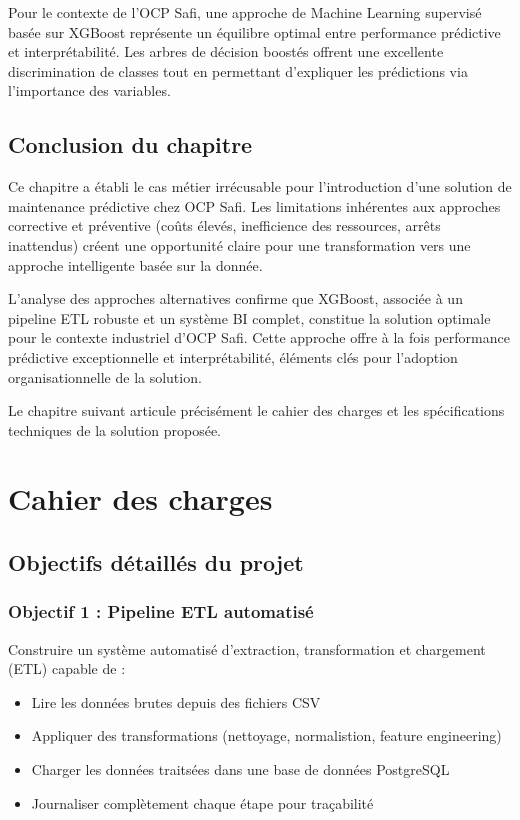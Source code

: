 \documentclass[a4paper,12pt,twoside]{report}
\begin{document}
Pour le contexte de l'OCP Safi, une approche de Machine Learning supervisé basée sur XGBoost représente un équilibre optimal entre performance prédictive et interprétabilité. Les arbres de décision boostés offrent une excellente discrimination de classes tout en permettant d'expliquer les prédictions via l'importance des variables.

\section*{Conclusion du chapitre}

Ce chapitre a établi le cas métier irrécusable pour l'introduction d'une solution de maintenance prédictive chez OCP Safi. Les limitations inhérentes aux approches corrective et préventive (coûts élevés, inefficience des ressources, arrêts inattendus) créent une opportunité claire pour une transformation vers une approche intelligente basée sur la donnée.

L'analyse des approches alternatives confirme que XGBoost, associée à un pipeline ETL robuste et un système BI complet, constitue la solution optimale pour le contexte industriel d'OCP Safi. Cette approche offre à la fois performance prédictive exceptionnelle et interprétabilité, éléments clés pour l'adoption organisationnelle de la solution.

Le chapitre suivant articule précisément le cahier des charges et les spécifications techniques de la solution proposée.

\chapter{Cahier des charges}

\section{Objectifs détaillés du projet}

\subsection{Objectif 1 : Pipeline ETL automatisé}

Construire un système automatisé d'extraction, transformation et chargement (ETL) capable de :
\begin{itemize}
    \item Lire les données brutes depuis des fichiers CSV
    \item Appliquer des transformations (nettoyage, normalistion, feature engineering)
    \item Charger les données traitsées dans une base de données PostgreSQL
    \item Journaliser complètement chaque étape pour traçabilité
\end{itemize}
\end{document}

